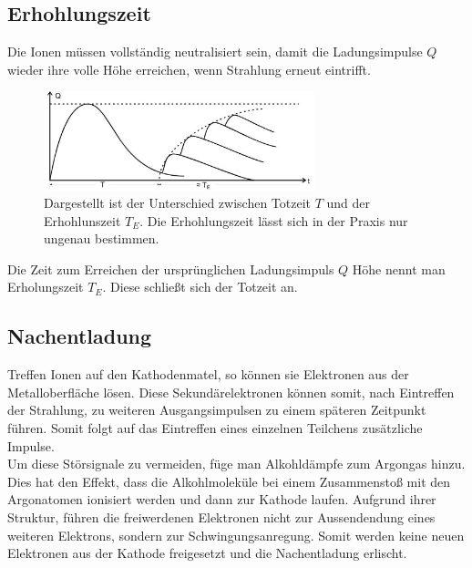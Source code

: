 \subsection{Erhohlungszeit}
Die Ionen müssen vollständig neutralisiert sein, damit die Ladungsimpulse $Q$ wieder
ihre volle Höhe erreichen, wenn Strahlung erneut eintrifft.
\begin{figure}[H]
    \centering
    \includegraphics[width=0.7\textwidth]{input/erhohlungszeit.jpg}
    \caption{Dargestellt ist der Unterschied zwischen Totzeit $T$ und der Erhohlunszeit $T_E$.
    Die Erhohlungszeit lässt sich in der Praxis nur ungenau bestimmen.\cite[223]{anleitung}}
\end{figure}
Die Zeit zum Erreichen der ursprünglichen Ladungsimpuls $Q$ Höhe nennt man Erholungszeit $T_E$.
Diese schließt sich der Totzeit an.
\subsection{Nachentladung}
Treffen Ionen auf den Kathodenmatel, so können sie Elektronen aus der 
Metalloberfläche lösen. Diese Sekundärelektronen können somit, nach Eintreffen der Strahlung,
zu weiteren Ausgangsimpulsen zu einem späteren Zeitpunkt führen. Somit folgt auf das
Eintreffen eines einzelnen Teilchens zusätzliche Impulse.\\
Um diese Störsignale zu vermeiden, füge man Alkohldämpfe zum Argongas hinzu.
Dies hat den Effekt, dass die Alkohlmoleküle bei einem Zusammenstoß mit den Argonatomen ionisiert werden
und dann zur Kathode laufen. Aufgrund ihrer Struktur, führen die freiwerdenen Elektronen nicht zur
Aussendendung eines weiteren Elektrons, sondern zur Schwingungsanregung.
Somit werden keine neuen Elektronen aus der Kathode freigesetzt und die Nachentladung erlischt. 


